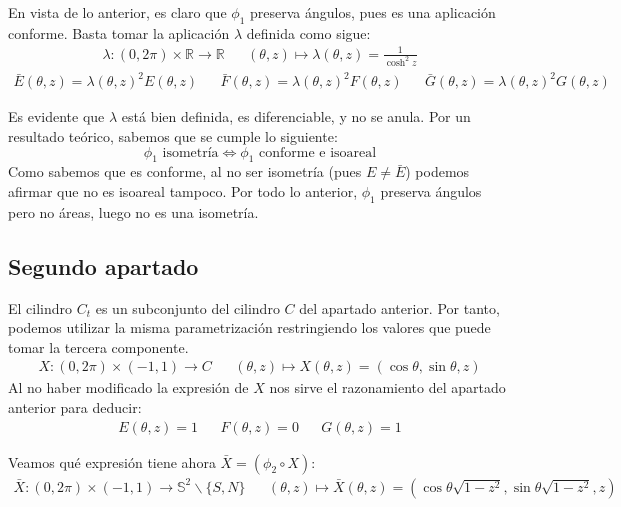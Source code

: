 \documentclass{article}
\begin{document}
\vspace{3mm}
En vista de lo anterior, es claro que $\phi_1$ preserva ángulos, pues es una aplicación conforme.
Basta tomar la aplicación $\lambda$ definida como sigue:
\begin{align*}
    \lambda : (0,2\pi) \times \mathbb{R} \longrightarrow \mathbb{R} &&
    (\theta, z) \longmapsto \lambda(\theta, z) = \frac{1}{\cosh^2z}
\end{align*}
\begin{align*}
    \bar{E}(\theta, z) = \lambda(\theta, z)^2 E(\theta, z) &&
    \bar{F}(\theta, z) = \lambda(\theta, z)^2 F(\theta, z) &&
    \bar{G}(\theta, z) = \lambda(\theta, z)^2 G(\theta, z)
\end{align*}

\vspace{2mm}
\noindent Es evidente que $\lambda$ está bien definida, es diferenciable, y no se anula.
\newpage
Por un resultado teórico, sabemos que se cumple lo siguiente:
$$ \phi_1 \text{ isometría} \iff \phi_1 \text{ conforme e isoareal}$$
Como sabemos que es conforme, al no ser isometría (pues $E \neq \bar{E}$)
podemos afirmar que no es isoareal tampoco. Por todo lo anterior, $\phi_1$
preserva ángulos pero no áreas, luego no es una isometría.

\vspace{10mm}
\subsection{Segundo apartado}
El cilindro $C_t$ es un subconjunto del cilindro $C$ del apartado anterior.
Por tanto, podemos utilizar la misma parametrización restringiendo los valores
que puede tomar la tercera componente.
\begin{align*}
    X : (0, 2\pi) \times (-1,1) \longrightarrow C&&
    (\theta, z) \longmapsto X(\theta, z) = \left(\cos\theta, \sin\theta, z\right)
\end{align*}
Al no haber modificado la expresión de $X$ nos sirve el razonamiento del apartado anterior para deducir:
\begin{align*}
    E(\theta, z) = 1 &&
    F(\theta, z) = 0 &&
    G(\theta, z) = 1
\end{align*}

\vspace{2mm} \noindent
Veamos qué expresión tiene ahora $\bar{X} = (\phi_2 \circ X)$:
\begin{align*}
    \bar{X}: (0,2\pi) \times (-1,1) \longrightarrow \mathbb{S}^2 \backslash \{S,N\} &&
    (\theta, z) \longmapsto \bar{X}(\theta, z) = \left(\cos\theta \sqrt{1-z^2},\sin\theta \sqrt{1-z^2},z\right)
\end{align*}
\end{document}
